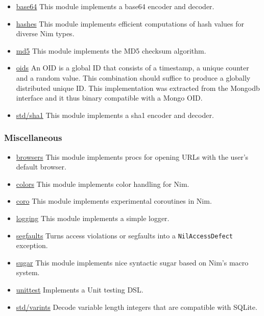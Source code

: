 \begin{itemize}
\tightlist
\item
  \href{base64.html}{base64} This module implements a base64 encoder and
  decoder.
\item
  \href{hashes.html}{hashes} This module implements efficient
  computations of hash values for diverse Nim types.
\item
  \href{md5.html}{md5} This module implements the MD5 checksum
  algorithm.
\item
  \href{oids.html}{oids} An OID is a global ID that consists of a
  timestamp, a unique counter and a random value. This combination
  should suffice to produce a globally distributed unique ID. This
  implementation was extracted from the Mongodb interface and it thus
  binary compatible with a Mongo OID.
\item
  \href{sha1.html}{std/sha1} This module implements a sha1 encoder and
  decoder.
\end{itemize}

\hypertarget{miscellaneous}{%
\subsubsection{Miscellaneous}\label{miscellaneous}}

\begin{itemize}
\tightlist
\item
  \href{browsers.html}{browsers} This module implements procs for
  opening URLs with the user's default browser.
\item
  \href{colors.html}{colors} This module implements color handling for
  Nim.
\item
  \href{coro.html}{coro} This module implements experimental coroutines
  in Nim.
\item
  \href{logging.html}{logging} This module implements a simple logger.
\item
  \href{segfaults.html}{segfaults} Turns access violations or segfaults
  into a \texttt{NilAccessDefect} exception.
\item
  \href{sugar.html}{sugar} This module implements nice syntactic sugar
  based on Nim's macro system.
\item
  \href{unittest.html}{unittest} Implements a Unit testing DSL.
\item
  \href{varints.html}{std/varints} Decode variable length integers that
  are compatible with SQLite.
\end{itemize}

